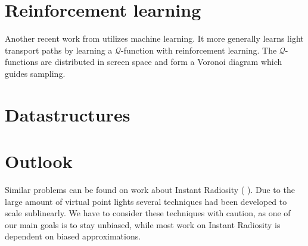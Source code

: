 \section{Reinforcement learning}

Another recent work from \cite{DBLP:journals/corr/DahmK17} utilizes machine learning. It more generally learns light transport paths by learning a $\mathcal{Q}$-function with reinforcement learning. The $\mathcal{Q}$-functions are distributed in screen space and form a Voronoi diagram which guides sampling.


\section{Datastructures}


\section{Outlook}

Similar problems can be found on work about Instant Radiosity (\cite{keller1997instant} \cite{Walter2005LightcutsAS} \cite{dachsbacher2014scalable}). Due to the large amount of virtual point lights several techniques had been developed to scale sublinearly. We have to consider these techniques with caution, as one of our main goals is to stay unbiased, while most work on Instant Radiosity is dependent on biased approximations.
